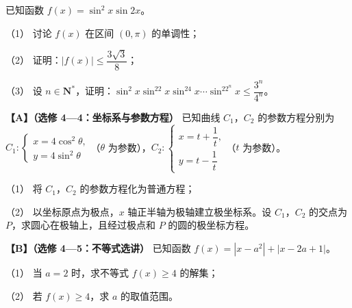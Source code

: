 \begin{question}
已知函数 $f(x)=\sin^2x\sin2x$。

（1） 讨论 $f(x)$ 在区间 $(0,\pi)$ 的单调性；

（2） 证明：$|f(x)|\leqslant\dfrac{3\sqrt3}8$；

（3） 设 $n\in\mathbf N^*$，证明：$\sin^2x\sin^22x\sin^24x\cdots\sin^22^nx\leqslant\dfrac{3^n}{4^n}$。

\end{question}
\begin{question}
\textbf{【A】（选修 4—4：坐标系与参数方程）} 已知曲线 $C_1$，$C_2$ 的参数方程分别为 $C_1:\begin{cases}x=4\cos^2\theta,\\y=4\sin^2\theta\end{cases}$（$\theta$ 为参数），$C_2:\begin{cases}x=t+\dfrac1t,\\y=t-\dfrac1t\end{cases}$（$t$ 为参数）。

（1） 将 $C_1$，$C_2$ 的参数方程化为普通方程；

（2） 以坐标原点为极点，$x$ 轴正半轴为极轴建立极坐标系。设 $C_1$，$C_2$ 的交点为 $P$，求圆心在极轴上，且经过极点和 $P$ 的圆的极坐标方程。

\end{question}
\begin{question}
\textbf{【B】（选修 4—5：不等式选讲）} 已知函数 $f(x)=|x-a^2|+|x-2a+1|$。

（1） 当 $a=2$ 时，求不等式 $f(x)\geqslant4$ 的解集；

（2） 若 $f(x)\geqslant4$，求 $a$ 的取值范围。

\end{question}